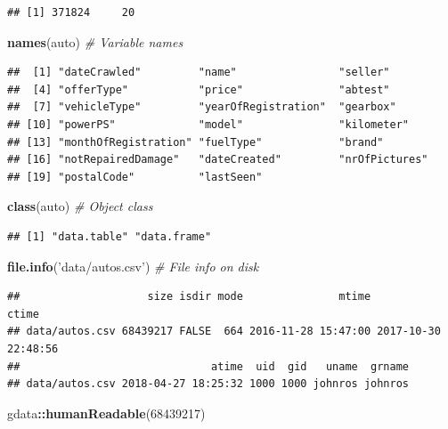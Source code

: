 \documentclass[]{book}
\newenvironment{Shaded}{\begin{snugshade}}{\end{snugshade}}
\newcommand{\KeywordTok}[1]{\textcolor[rgb]{0.13,0.29,0.53}{\textbf{#1}}}
\newcommand{\DecValTok}[1]{\textcolor[rgb]{0.00,0.00,0.81}{#1}}
\newcommand{\StringTok}[1]{\textcolor[rgb]{0.31,0.60,0.02}{#1}}
\newcommand{\CommentTok}[1]{\textcolor[rgb]{0.56,0.35,0.01}{\textit{#1}}}
\newcommand{\OperatorTok}[1]{\textcolor[rgb]{0.81,0.36,0.00}{\textbf{#1}}}
\newcommand{\NormalTok}[1]{#1}
\theoremstyle{definition}
\theoremstyle{definition}
\theoremstyle{definition}
\theoremstyle{remark}
\begin{document}
\begin{verbatim}
## [1] 371824     20
\end{verbatim}

\begin{Shaded}
\begin{Highlighting}[]
\KeywordTok{names}\NormalTok{(auto) }\CommentTok{# Variable names}
\end{Highlighting}
\end{Shaded}

\begin{verbatim}
##  [1] "dateCrawled"         "name"                "seller"             
##  [4] "offerType"           "price"               "abtest"             
##  [7] "vehicleType"         "yearOfRegistration"  "gearbox"            
## [10] "powerPS"             "model"               "kilometer"          
## [13] "monthOfRegistration" "fuelType"            "brand"              
## [16] "notRepairedDamage"   "dateCreated"         "nrOfPictures"       
## [19] "postalCode"          "lastSeen"
\end{verbatim}

\begin{Shaded}
\begin{Highlighting}[]
\KeywordTok{class}\NormalTok{(auto) }\CommentTok{# Object class}
\end{Highlighting}
\end{Shaded}

\begin{verbatim}
## [1] "data.table" "data.frame"
\end{verbatim}

\begin{Shaded}
\begin{Highlighting}[]
\KeywordTok{file.info}\NormalTok{(}\StringTok{'data/autos.csv'}\NormalTok{) }\CommentTok{# File info on disk}
\end{Highlighting}
\end{Shaded}

\begin{verbatim}
##                    size isdir mode               mtime               ctime
## data/autos.csv 68439217 FALSE  664 2016-11-28 15:47:00 2017-10-30 22:48:56
##                              atime  uid  gid   uname  grname
## data/autos.csv 2018-04-27 18:25:32 1000 1000 johnros johnros
\end{verbatim}

\begin{Shaded}
\begin{Highlighting}[]
\NormalTok{gdata}\OperatorTok{::}\KeywordTok{humanReadable}\NormalTok{(}\DecValTok{68439217}\NormalTok{)}
\end{Highlighting}
\end{Shaded}
\end{document}
